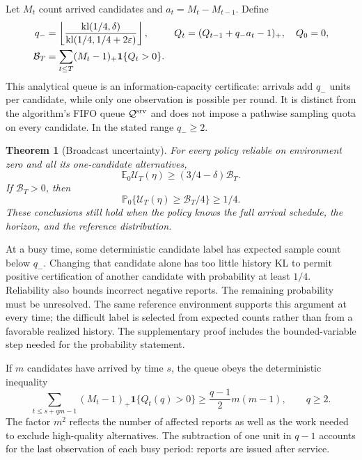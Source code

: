 \documentclass[11pt]{article}
\newtheorem{theorem}{Theorem}[section]
\theoremstyle{remark}
\newcommand{\E}{\mathbb E}
\newcommand{\Prob}{\mathbb P}
\newcommand{\ind}{\mathbf 1}
\newcommand{\kl}{\operatorname{kl}}
\begin{document}
Let $M_t$ count arrived candidates and $a_t=M_t-M_{t-1}$. Define
\begin{align}
 q_-&=\left\lfloor\frac{\kl(1/4,\delta)}
                              {\kl(1/4,1/4+2\varepsilon)}\right\rfloor,
 &Q_t&=(Q_{t-1}+q_-a_t-1)_+,\quad Q_0=0,\notag\\
 \mathcal B_T&=\sum_{t\le T}(M_t-1)_+\ind\{Q_t>0\}.
 \label{eq:broadcast_queue}
\end{align}
This analytical queue is an information-capacity certificate: arrivals add
$q_-$ units per candidate, while only one observation is possible per round.
It is distinct from the algorithm's FIFO queue $\mathcal Q^{\rm srv}$ and
does not impose a pathwise sampling quota on every candidate. In the stated
range $q_-\ge2$.

\begin{theorem}[Broadcast uncertainty]
\label{thm:broadcast}
For every policy reliable on environment zero and all its one-candidate
alternatives,
\[
 \E_0\mathcal U_T(\eta)\ge(3/4-\delta)\mathcal B_T.
\]
If $\mathcal B_T>0$, then
\[
 \Prob_0\{\mathcal U_T(\eta)\ge\mathcal B_T/4\}\ge1/4.
\]
These conclusions still hold when the policy knows the full arrival schedule,
the horizon, and the reference distribution.
\end{theorem}

At a busy time, some deterministic candidate label has expected sample count
below $q_-$. Changing that candidate alone has too little history KL to permit
positive certification of another candidate with probability at least $1/4$.
Reliability also bounds incorrect negative reports. The remaining probability
must be unresolved. The same reference environment supports this argument at
every time; the difficult label is selected from expected counts rather than
from a favorable realized history. The supplementary proof includes the
bounded-variable step needed for the probability statement.

If $m$ candidates have arrived by time $s$, the queue obeys the deterministic
inequality
\begin{equation}
 \sum_{t\le s+qm-1}(M_t-1)_+\ind\{Q_t(q)>0\}
                  \ge\frac{q-1}{2}m(m-1),\qquad q\ge2.
 \label{eq:queue_area}
\end{equation}
The factor $m^2$ reflects the number of affected reports as well as the work
needed to exclude high-quality alternatives. The subtraction of one unit in
$q-1$ accounts for the last observation of each busy period: reports are issued
after service.
\end{document}
